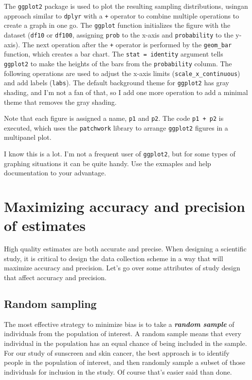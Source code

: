 \documentclass[
]{book}
\begin{document}
The \texttt{ggplot2} package is used to plot the resulting sampling distributions, usingan approach similar to \texttt{dplyr} with a \texttt{+} operator to combine multiple operations to create a graph in one go. The \texttt{ggplot} function initializes the figure with the dataset (\texttt{df10} or \texttt{df100}, assigning \texttt{prob} to the x-axis and \texttt{probability} to the y-axis). The next operation after the \texttt{+} operator is performed by the \texttt{geom\_bar} function, which creates a bar chart. The \texttt{stat\ =\ identity} argument tells \texttt{ggplot2} to make the heights of the bars from the \texttt{probability} column. The following operations are used to adjust the x-axis limits (\texttt{scale\_x\_continuous}) and add labels (\texttt{labs}). The default background theme for \texttt{ggplot2} has gray shading, and I'm not a fan of that, so I add one more operation to add a minimal theme that removes the gray shading.

Note that each figure is assigned a name, \texttt{p1} and \texttt{p2}. The code \texttt{p1\ +\ p2} is executed, which uses the \texttt{patchwork} library to arrange \texttt{ggplot2} figures in a multipanel plot.

I know this is a lot. I'm not a frequent user of \texttt{ggplot2}, but for some types of graphing situations it can be quite handy. Use the exmaples and help documentation to your advantage.

\section{Maximizing accuracy and precision of estimates}\label{maximizing-accuracy-and-precision-of-estimates}

High quality estimates are both accurate and precise. When designing a scientific study, it is critical to design the data collection scheme in a way that will maximize accuracy and precision. Let's go over some attributes of study design that affect accuracy and precision.

\subsection{Random sampling}\label{random-sampling}

The most effective strategy to minimize bias is to take a \textbf{\emph{random sample}} of individuals from the population of interest. A random sample means that every individual in the population has an equal chance of being included in the sample. For our study of sunscreen and skin cancer, the best approach is to identify people in the population of interest, and then randomly sample a subset of those individuals for inclusion in the study. Of course that's easier said than done.
\end{document}

